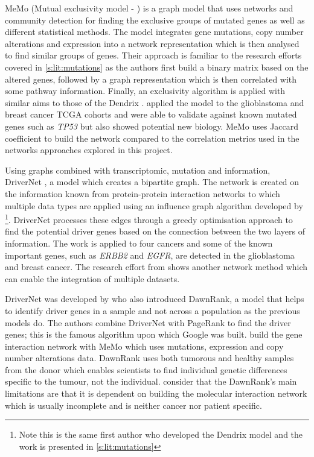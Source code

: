 MeMo (Mutual exclusivity model - \cite{Ciriello2012-hi}) is a graph model that uses networks and community detection for finding the exclusive groups of mutated genes as well as different statistical methods. The model integrates gene mutations, copy number alterations and expression into a network representation which is then analysed to find similar groups of genes. Their approach is familiar to the research efforts covered in \cref{s:lit:mutations} as the authors first build a binary matrix based on the altered genes, followed by a graph representation which is then correlated with some pathway information. Finally, an exclusivity algorithm is applied with similar aims to those of the Dendrix \citep{Vandin2012-cf}. \citet{Ciriello2012-hi} applied the model to the glioblastoma and breast cancer TCGA cohorts and were able to validate against known mutated genes such as \textit{TP53} but also showed potential new biology. MeMo uses Jaccard coefficient to build the network compared to the correlation metrics used in the networks approaches explored in this project. 

Using graphs combined with transcriptomic, mutation and information, DriverNet  \citep{Bashashati2012-lk}, a model which creates a bipartite graph. The network is created on the information known from protein-protein interaction networks to which multiple data types are applied using an influence graph algorithm developed by \citet{Vandin2011-bs}\footnote{Note this is the same first author who developed the Dendrix model and the work is presented in \cref{s:lit:mutations}}. DriverNet processes these edges through a greedy optimisation approach to find the potential driver genes based on the connection between the two layers of information. The work is applied to four cancers and some of the known important genes, such as \textit{ERBB2} and \textit{EGFR}, are detected in the glioblastoma and breast cancer. The research effort from \citet{Bashashati2012-lk} shows another network method which can enable the integration of multiple datasets.

DriverNet was developed by \citet{Hou2014-se} who also introduced DawnRank, a model that helps to identify driver genes in a sample and not across a population as the previous models do. The authors combine DriverNet with PageRank to find the driver genes; this is the famous algorithm upon which Google was built. \citet{Hou2014-se} build the gene interaction network with MeMo \citep{Ciriello2012-hi} which uses mutations, expression and copy number alterations data. DawnRank uses both tumorous and healthy samples from the donor which enables scientists to find individual genetic differences specific to the tumour, not the individual. \citet{Hou2014-se} consider that the DawnRank's main limitations are that it is dependent on building the molecular interaction network which is usually incomplete and is neither cancer nor patient specific. 


